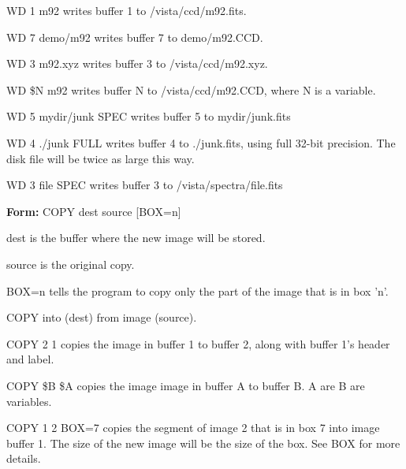 {\newpage\clearpage
{}%
\begin{example}
  \item[WD 1 m92\hfill]{writes buffer 1 to /vista/ccd/m92.fits.}
  \item[WD 7 demo/m92\hfill]{writes buffer 7 to demo/m92.CCD.}
  \item[WD 3 m92.xyz\hfill]{writes buffer 3 to /vista/ccd/m92.xyz.}
  \item[WD \$N m92\hfill]{writes buffer N to /vista/ccd/m92.CCD, where
        N is a variable.}
  \item[WD 5 mydir/junk SPEC\hfill]{writes buffer 5 to mydir/junk.fits}
  \item[WD 4 ./junk FULL\hfill]{writes buffer 4 to ./junk.fits, using
        full 32-bit precision.  The disk file will be twice as large this way.}
  \item[WD 3 file SPEC\hfill]{writes buffer 3 to /vista/spectra/file.fits}
\end{example}%
\lthtmlfigureZ
\lthtmlcheckvsize\clearpage}

{\newpage\clearpage
{}%
\begin{command}
  \item[\textbf{Form: } COPY dest source {[BOX=n]}\hfill]{}
  \item[dest]{is the buffer where the new image will be stored.}
  \item[source]{is the original copy.}
  \item[BOX=n]{tells the program to copy only the part of the
       image that is in box 'n'.}
\end{command}%
\lthtmlfigureZ
\lthtmlcheckvsize\clearpage}

{\newpage\clearpage
{}%
\begin{hanging}
  \item{COPY into (dest) from image (source).}
\end{hanging}%
\lthtmlfigureZ
\lthtmlcheckvsize\clearpage}

{\newpage\clearpage
{}%
\begin{example}
  \item[COPY 2 1\hfill]{copies the image in buffer 1 to
       buffer 2, along with buffer 1's header
       and label.}
  \item[COPY \$B \$A\hfill]{copies the image image in buffer A to 
       buffer B. A are B are variables.}
  \item[COPY 1 2 BOX=7\hfill]{copies the segment of image 2 that is
       in box 7 into image buffer 1.  The
       size of the new image will be the size
       of the box.  See BOX for more details.}
\end{example}%
\lthtmlfigureZ
\lthtmlcheckvsize\clearpage}

